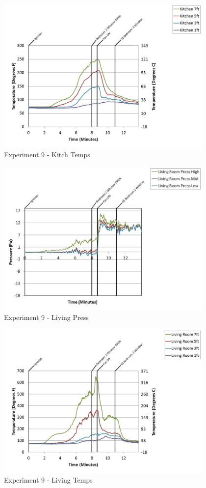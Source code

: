 \documentclass{article}
\begin{document}
\begin{appendices}
	\begin{figure}[h!]
		\centering
		\includegraphics[height=3.05in]{0_Images/Results_Charts/Exp_9_Charts/KitchTemps.pdf}
		\caption{Experiment 9 - Kitch Temps}
	\end{figure}
 
	\clearpage

	\begin{figure}[h!]
		\centering
		\includegraphics[height=3.05in]{0_Images/Results_Charts/Exp_9_Charts/LivingPress.pdf}
		\caption{Experiment 9 - Living Press}
	\end{figure}
 

	\begin{figure}[h!]
		\centering
		\includegraphics[height=3.05in]{0_Images/Results_Charts/Exp_9_Charts/LivingTemps.pdf}
		\caption{Experiment 9 - Living Temps}
	\end{figure}
 

\end{appendices}
\end{document}
